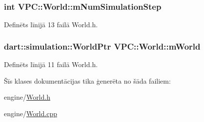\subsubsection[{\texorpdfstring{m\+Num\+Simulation\+Step}{mNumSimulationStep}}]{\setlength{\rightskip}{0pt plus 5cm}int V\+P\+C\+::\+World\+::m\+Num\+Simulation\+Step\hspace{0.3cm}{\ttfamily [private]}}\hypertarget{class_v_p_c_1_1_world_a264392e9cea05755e4b452f118251d3f}{}\label{class_v_p_c_1_1_world_a264392e9cea05755e4b452f118251d3f}


Definēts līnijā 13 failā World.\+h.

\subsubsection[{\texorpdfstring{m\+World}{mWorld}}]{\setlength{\rightskip}{0pt plus 5cm}dart\+::simulation\+::\+World\+Ptr V\+P\+C\+::\+World\+::m\+World\hspace{0.3cm}{\ttfamily [private]}}\hypertarget{class_v_p_c_1_1_world_a4a70a334fda433d89f96c0858368020e}{}\label{class_v_p_c_1_1_world_a4a70a334fda433d89f96c0858368020e}


Definēts līnijā 11 failā World.\+h.



Šīs klases dokumentācijas tika ģenerēta no šāda failiem\+:\begin{DoxyCompactItemize}
\item 
engine/\hyperlink{_world_8h}{World.\+h}\item 
engine/\hyperlink{_world_8cpp}{World.\+cpp}\end{DoxyCompactItemize}
